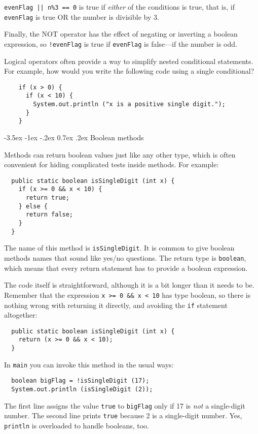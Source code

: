 \documentclass{book}
\makeatletter
\renewcommand{\section}{\@startsection 
    {section} {1} {0mm}%
    {-3.5ex \@plus -1ex \@minus -.2ex}%
    {0.7ex \@plus.2ex}%
    {\normalfont\Large\bfseries}}
\makeatother
\begin{document}

{\tt evenFlag || n\%3 == 0} is true if {\em either} of
the conditions is true, that is, if {\tt evenFlag} is true OR the
number is divisible by 3.

Finally, the NOT operator has the effect of negating or
inverting a boolean expression, so {\tt !evenFlag} is true
if {\tt evenFlag} is false---if the number is odd.


Logical operators often provide a way to simplify nested
conditional statements.  For example, how would you write
the following code using a single conditional?

\begin{verbatim}
    if (x > 0) {
      if (x < 10) {
        System.out.println ("x is a positive single digit.");
      }
    }
\end{verbatim}

\section{Boolean methods}
\label{boolean}

Methods can return boolean values just like any other type,
which is often convenient for hiding complicated tests inside
methods.  For example:

\begin{verbatim}
  public static boolean isSingleDigit (int x) {
    if (x >= 0 && x < 10) {
      return true;
    } else {
      return false;
    }
  }
\end{verbatim}
%
The name of this method is {\tt isSingleDigit}.  It is common
to give boolean methods names that sound like yes/no questions.
The return type is {\tt boolean}, which means that every return
statement has to provide a boolean expression.

The code itself is straightforward, although it is a bit longer than
it needs to be.  Remember that the expression {\tt x >= 0 \&\& x < 10}
has type boolean, so there is nothing wrong with returning it
directly, and avoiding the {\tt if} statement altogether:

\begin{verbatim}
  public static boolean isSingleDigit (int x) {
    return (x >= 0 && x < 10);
  }
\end{verbatim}
%
In {\tt main} you can invoke this method in the usual ways:

\begin{verbatim}
  boolean bigFlag = !isSingleDigit (17);
  System.out.println (isSingleDigit (2));
\end{verbatim}
%
The first line assigns the value {\tt true} to {\tt bigFlag}
only if 17 is {\em not} a single-digit number.  The second
line prints {\tt true} because 2 is a single-digit number.
Yes, {\tt println} is overloaded to handle booleans, too.
\end{document}
